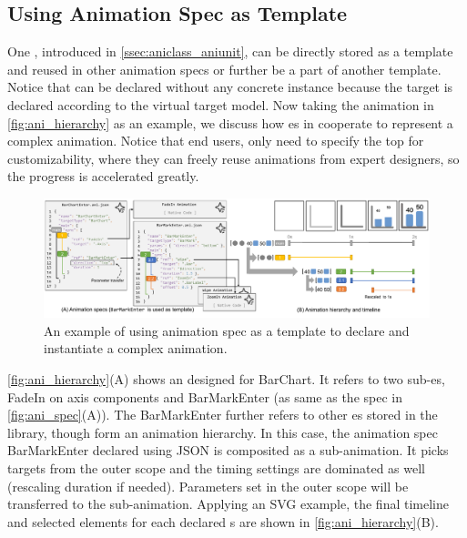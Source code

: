 \subsection{Using Animation Spec as Template}
\label{ssec:extend_template}

One \aniclass{}, introduced in \autoref{ssec:aniclass_aniunit}, can be directly stored as a template and reused in other animation specs or further be a part of another template.
Notice that \aniclass{} can be declared without any concrete instance because the target is declared according to the virtual target model.
Now taking the animation in \autoref{fig:ani_hierarchy} as an example, we discuss how \aniclass{}es in \gaia{} cooperate to represent a complex animation.
Notice that end users, only need to specify the top \aniclass{} for customizability, where they can freely reuse animations from expert designers, so the progress is accelerated greatly.

\begin{figure}[h]
  \centering
  \includegraphics[width=\linewidth]{figs/ani_hierarchy.pdf}
  \caption{An example of using animation spec as a template to declare and instantiate a complex animation.}
  \label{fig:ani_hierarchy}
\end{figure}

\autoref{fig:ani_hierarchy}(A) shows an \aniclass{} designed for BarChart. 
It refers to two sub-\aniclass{}es, FadeIn on axis components and BarMarkEnter (as same as the spec in \autoref{fig:ani_spec}(A)).
The BarMarkEnter further refers to other \aniclass{}es stored in the library, though form an animation hierarchy.
In this case, the animation spec BarMarkEnter declared using JSON is composited as a sub-animation.
It picks targets from the outer scope and the timing settings are dominated as well (rescaling duration if needed).
Parameters set in the outer scope will be transferred to the sub-animation.
Applying an SVG example, the final timeline and selected elements for each declared \aniunit{}s are shown in \autoref{fig:ani_hierarchy}(B).

